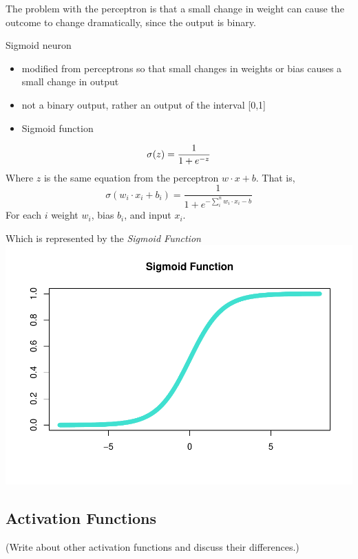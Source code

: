 \documentclass[
]{article}
\providecommand{\tightlist}{%
  \setlength{\itemsep}{0pt}\setlength{\parskip}{0pt}}
\begin{document}
The problem with the perceptron is that a small change in weight can
cause the outcome to change dramatically, since the output is binary.

Sigmoid neuron

\begin{itemize}
\tightlist
\item
  modified from perceptrons so that small changes in weights or bias
  causes a small change in output
\item
  not a binary output, rather an output of the interval {[}0,1{]}
\item
  Sigmoid function
\end{itemize}

\[
\sigma(z) = \frac{1}{1+e^{-z}} \\
\] Where \(z\) is the same equation from the perceptron
\(w \cdot x + b\). That is, \[
\sigma(w_i \cdot x_i + b_i) = \frac{1}{1+e^{-\sum_i^n w_i \cdot x_i - b}}
\] For each \(i\) weight \(w_i\), bias \(b_i\), and input \(x_i\).

Which is represented by the \emph{Sigmoid Function}
\includegraphics{ANN_files/unnamed-chunk-2-1.pdf}

\hypertarget{activation-functions}{%
\subsection{Activation Functions}\label{activation-functions}}

(Write about other activation functions and discuss their differences.)
\end{document}
